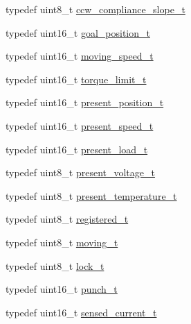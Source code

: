 \begin{DoxyCompactItemize}
typedef uint8\+\_\+t \hyperlink{structdynamixel_1_1servos_1_1_model_traits_3_01_ex106_01_4_1_1_c_t_a8deecebcb845496af2888b0da2b8962e}{ccw\+\_\+compliance\+\_\+slope\+\_\+t}
\item 
typedef uint16\+\_\+t \hyperlink{structdynamixel_1_1servos_1_1_model_traits_3_01_ex106_01_4_1_1_c_t_ade66d9df3890c050627762b347e7ef7a}{goal\+\_\+position\+\_\+t}
\item 
typedef uint16\+\_\+t \hyperlink{structdynamixel_1_1servos_1_1_model_traits_3_01_ex106_01_4_1_1_c_t_ae57f9a7f5645d154e985231cc25df19d}{moving\+\_\+speed\+\_\+t}
\item 
typedef uint16\+\_\+t \hyperlink{structdynamixel_1_1servos_1_1_model_traits_3_01_ex106_01_4_1_1_c_t_a9443fe60ff3d93c262cd6ab32990842d}{torque\+\_\+limit\+\_\+t}
\item 
typedef uint16\+\_\+t \hyperlink{structdynamixel_1_1servos_1_1_model_traits_3_01_ex106_01_4_1_1_c_t_a4f6bf16e6b395481ce865abe88d58a20}{present\+\_\+position\+\_\+t}
\item 
typedef uint16\+\_\+t \hyperlink{structdynamixel_1_1servos_1_1_model_traits_3_01_ex106_01_4_1_1_c_t_ab58bdb1dd4fbab1f4d71168e558751f3}{present\+\_\+speed\+\_\+t}
\item 
typedef uint16\+\_\+t \hyperlink{structdynamixel_1_1servos_1_1_model_traits_3_01_ex106_01_4_1_1_c_t_a7c13ab291d712ea51a36346513ea0571}{present\+\_\+load\+\_\+t}
\item 
typedef uint8\+\_\+t \hyperlink{structdynamixel_1_1servos_1_1_model_traits_3_01_ex106_01_4_1_1_c_t_a64426a929b4b57b64b7a1b0f010c00f7}{present\+\_\+voltage\+\_\+t}
\item 
typedef uint8\+\_\+t \hyperlink{structdynamixel_1_1servos_1_1_model_traits_3_01_ex106_01_4_1_1_c_t_ad8442b12bd4f3eda547fe1249afdc14e}{present\+\_\+temperature\+\_\+t}
\item 
typedef uint8\+\_\+t \hyperlink{structdynamixel_1_1servos_1_1_model_traits_3_01_ex106_01_4_1_1_c_t_ac0000e798cc34a716ebabc3ca0229d03}{registered\+\_\+t}
\item 
typedef uint8\+\_\+t \hyperlink{structdynamixel_1_1servos_1_1_model_traits_3_01_ex106_01_4_1_1_c_t_a2cd9e1d517c7682284d0243bbc3bdfbb}{moving\+\_\+t}
\item 
typedef uint8\+\_\+t \hyperlink{structdynamixel_1_1servos_1_1_model_traits_3_01_ex106_01_4_1_1_c_t_a462acc540698555c54791b3845c7a554}{lock\+\_\+t}
\item 
typedef uint16\+\_\+t \hyperlink{structdynamixel_1_1servos_1_1_model_traits_3_01_ex106_01_4_1_1_c_t_a9948543ba670d97a077210d4263e802d}{punch\+\_\+t}
\item 
typedef uint16\+\_\+t \hyperlink{structdynamixel_1_1servos_1_1_model_traits_3_01_ex106_01_4_1_1_c_t_ab465d59768fbf996f534ac99a418a0c7}{sensed\+\_\+current\+\_\+t}
\end{DoxyCompactItemize}
